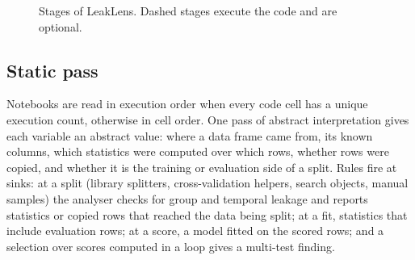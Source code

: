 \documentclass[conference]{IEEEtran}
\newcommand{\tool}{LeakLens}
\newcommand{\code}[1]{\texttt{#1}}
\begin{document}
\begin{figure}[t]
\centering
{}
\caption{Stages of \tool{}. Dashed stages execute the code and are optional.}
\label{fig:pipeline}
\end{figure}

\subsection{Static pass}
\label{sec:static}

Notebooks are read in execution order when every code cell has a unique execution count, otherwise in cell order.
One pass of abstract interpretation gives each variable an abstract value: where a data frame came from, its known
columns, which statistics were computed over which rows, whether rows were copied, and whether it is the training
or evaluation side of a split. Rules fire at sinks: at a split (library splitters, cross-validation helpers, search
objects, manual samples) the analyser checks for group and temporal leakage and reports statistics or copied rows
that reached the data being split; at a fit, statistics that include evaluation rows; at a score, a model fitted on
the scored rows; and a selection over scores computed in a loop gives a multi-test finding.
\end{document}
